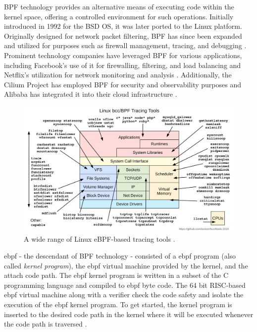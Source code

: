 \ac{BPF} technology provides an alternative means of executing code within the kernel space, offering a controlled environment for such operations. 
Initially introduced in 1992 for the \ac{BSD} OS, it was later ported to the Linux platform. 
Originally designed for network packet filtering, \ac{BPF} has since been expanded and utilized for purposes such as firewall management, tracing, and debugging \cite{McCanne_intro_bpf} \cite{lwn_intro_ebpf}. 
Prominent technology companies have leveraged \ac{BPF} for various applications, including Facebook's use of it for firewalling, filtering, and load balancing \cite{facebook_katran_ebpf_2018} and Netflix's utilization for network monitoring and analysis \cite{netflix_network_insight}. 
Additionally, the Cilium Project has employed \ac{BPF} for security and observability purposes \cite{cilium_io_page} and Alibaba has integrated it into their cloud infrastructure \cite{alibaba_cloud_ebpf}.

\begin{figure}[H]
    \centering
    \includegraphics[width=1.0\textwidth]{resources/images/bcc_tracing_tools_2019.png}
    \caption{A wide range of Linux eBPF-based tracing tools \cite{iovisor_page}.}\label{fig:approach_design:tracing_tools_linux}
\end{figure}

\ac{ebpf} - the descendant of \ac{BPF} technology - consisted of a \ac{ebpf} program (also called \textit{kernel program}), the \ac{ebpf} virtual machine provided by the kernel, and the attach code path.
The \ac{ebpf} kernel program is written in a subset of the C programming language and compiled to \ac{ebpf} byte code.
The 64 bit \ac{RISC}-based \ac{ebpf} virtual machine along with a verifier check the code safety and isolate the execution of the \ac{ebpf} kernel program.
To get started, the kernel program is inserted to the desired code path in the kernel where it will be executed whenever the code path is traversed \cite{lwn_intro_ebpf}.


